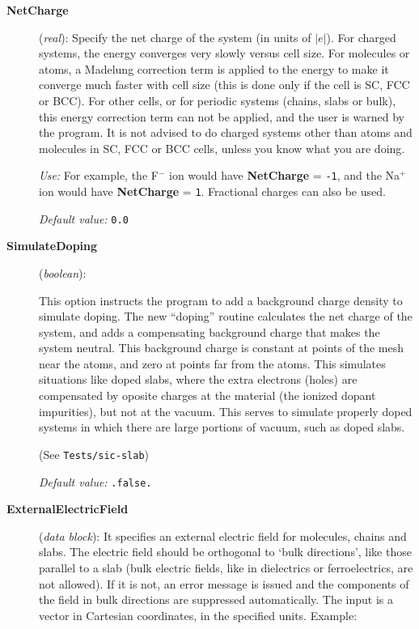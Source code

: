 \documentclass[11pt]{article}
\begin{document}
\begin{description}

\item[{\bf NetCharge}] ({\it real}):
Specify the net charge of the system (in units of $|e|$).
For charged systems, the energy converges very slowly
versus cell size. For molecules or atoms, a Madelung
correction term is applied to the energy to make it converge
much faster with cell size (this is done only if
the cell is SC, FCC or BCC). For other cells, or for
periodic systems (chains, slabs or bulk), this energy
correction term can not be applied, and the user is warned
by the program.   It is not advised to do charged systems
other than atoms and molecules in SC, FCC or BCC cells,
unless you know what you are doing.

{\it Use:}
For example, the F$^-$ ion would have {\bf NetCharge} = {\tt -1},
and the Na$^+$ ion would have {\bf NetCharge} = {\tt 1}.
Fractional charges can also be used.

{\it Default value:} {\tt 0.0}

\item[{\bf SimulateDoping}] ({\it boolean}):

This option instructs the program to add a background charge density
to simulate doping.  The new ``doping'' routine calculates the net
charge of the system, and adds a compensating background charge that
makes the system neutral. This background charge is constant at points
of the mesh near the atoms, and zero at points far from the atoms.
This simulates situations like doped slabs, where the extra electrons
(holes) are compensated by oposite charges at the material (the
ionized dopant impurities), but not at the vacuum.  This serves to
simulate properly doped systems in which there are large portions of
vacuum, such as doped slabs.

(See {\tt Tests/sic-slab})

{\it Default value:} {\tt .false.}

\item[{\bf ExternalElectricField}] ({\it data block}):
It specifies an external electric field for molecules, chains and slabs.
The electric field should be orthogonal to `bulk directions', like
those parallel to a slab (bulk electric fields, like in
dielectrics or ferroelectrics, are not allowed). If it is not, an
error message is issued and the components of the field in bulk
directions are suppressed automatically. The input is a
vector in Cartesian coordinates, in the specified units. Example:


\end{description}
\end{document}
